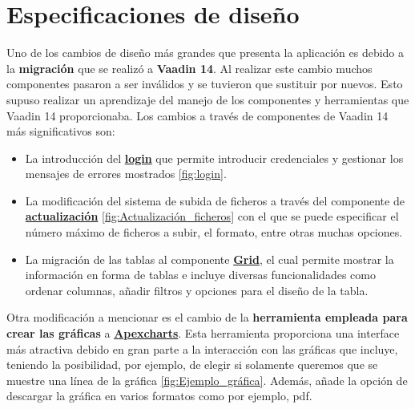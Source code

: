 
\section{Especificaciones de diseño}

Uno de los cambios de diseño más grandes que presenta la aplicación es debido a la \textbf{migración} que se realizó a \textbf{Vaadin 14}. Al realizar este cambio muchos componentes pasaron a ser inválidos y se tuvieron que sustituir por nuevos. Esto supuso realizar un aprendizaje del manejo de los componentes y herramientas que Vaadin 14 proporcionaba.
Los cambios a través de componentes de Vaadin 14 más significativos son:
\begin{itemize}
	\tightlist
	\item La introducción del \textbf{\href{https://vaadin.com/components/vaadin-login}{login}} que permite introducir credenciales y gestionar los mensajes de errores mostrados \ref{fig:login}. 
	
	
	\item La modificación del sistema de subida de ficheros a través del componente de \textbf{\href{https://vaadin.com/components/vaadin-upload}{actualización}} \ref{fig:Actualización_ficheros} con el que se puede especificar el número máximo de ficheros a subir, el formato, entre otras muchas opciones. 
	
	
	\item La migración de las tablas al componente \textbf{\href{https://vaadin.com/docs/v14/flow/components/tutorial-flow-grid}{Grid}}, el cual permite mostrar la información en forma de tablas e incluye diversas funcionalidades como ordenar columnas, añadir filtros y opciones para el diseño de la tabla.  	
\end{itemize}

Otra modificación a mencionar es el cambio de la \textbf{herramienta empleada para crear las gráficas} a\textbf{ \href{https://apexcharts.com/}{Apexcharts}}.
Esta herramienta proporciona una interface más atractiva debido en gran parte a la interacción con las gráficas que incluye, teniendo la posibilidad, por ejemplo, de elegir si solamente queremos que se muestre una línea de la gráfica \ref{fig:Ejemplo_gráfica}. 
Además, añade la opción de descargar la gráfica en varios formatos como por ejemplo, pdf. 

